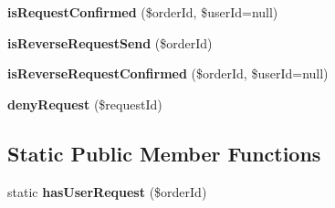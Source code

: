 \begin{DoxyCompactItemize}
{\bfseries is\+Request\+Confirmed} (\$order\+Id, \$user\+Id=null)
\item 
\hypertarget{classapp_1_1models_1_1_request_ac9cda0a12c6277fb0944cd84a38030f6}{}\label{classapp_1_1models_1_1_request_ac9cda0a12c6277fb0944cd84a38030f6} 
{\bfseries is\+Reverse\+Request\+Send} (\$order\+Id)
\item 
\hypertarget{classapp_1_1models_1_1_request_aa2845cbee688b64cf54571e1ed9d344b}{}\label{classapp_1_1models_1_1_request_aa2845cbee688b64cf54571e1ed9d344b} 
{\bfseries is\+Reverse\+Request\+Confirmed} (\$order\+Id, \$user\+Id=null)
\item 
\hypertarget{classapp_1_1models_1_1_request_a855fc1d62fe52310960b5c548e0ba696}{}\label{classapp_1_1models_1_1_request_a855fc1d62fe52310960b5c548e0ba696} 
{\bfseries deny\+Request} (\$request\+Id)
\end{DoxyCompactItemize}
\subsection*{Static Public Member Functions}
\begin{DoxyCompactItemize}
\item 
\hypertarget{classapp_1_1models_1_1_request_acb49a1e6d0325d6ff630aa0c942e9d5e}{}\label{classapp_1_1models_1_1_request_acb49a1e6d0325d6ff630aa0c942e9d5e} 
static {\bfseries has\+User\+Request} (\$order\+Id)
\end{DoxyCompactItemize}
